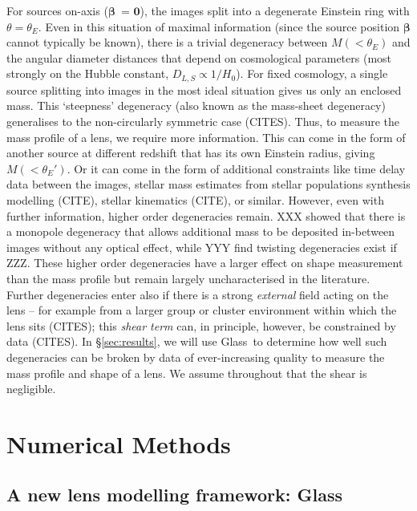\documentclass[galley,usenatbib]{mn2e}
\newcommand{\Glass}{{\sc Glass}}
\newcommand{\secref}[1] {\S\ref{#1}}
\renewcommand{\vec}[1]{\ensuremath{\boldsymbol{#1}}}
\begin{document}
For sources on-axis (\vec\beta\ = \vec0), the images split into a degenerate Einstein ring with $\theta = \theta_E$. Even in this situation of maximal information (since the source position $\vec\beta$ cannot typically be known), there is a trivial degeneracy between $M(<\theta_E)$ and the angular diameter distances that depend on cosmological parameters (most strongly on the Hubble constant, $D_{L,S} \propto 1/H_0$). For fixed cosmology, a single source splitting into images in the most ideal situation gives us only an enclosed mass. This `steepness' degeneracy (also known as the mass-sheet degeneracy) generalises to the non-circularly symmetric case (CITES). Thus, to measure the mass profile of a lens, we require more information. This can come in the form of another source at different redshift that has its own Einstein radius, giving $M(<\theta_E')$. Or it can come in the form of additional constraints like time delay data between the images, stellar mass estimates from stellar populations synthesis modelling (CITE), stellar kinematics (CITE), or similar. However, even with further information, higher order degeneracies remain. XXX showed that there is a monopole degeneracy that allows additional mass to be deposited in-between images without any optical effect, while YYY find twisting degeneracies exist if ZZZ. These higher order degeneracies have a larger effect on shape measurement than the mass profile but remain largely uncharacterised in the literature. Further degeneracies enter also if there is a strong {\it external} field acting on the lens -- for example from a larger group or cluster environment within which the lens sits (CITES); this {\it shear term} can, in principle, however, be constrained by data (CITES). In \secref{sec:results}, we will use \Glass\ to determine how well such degeneracies can be broken by data of ever-increasing quality to measure the mass profile and shape of a lens. We assume throughout that the shear is negligible. 

\section{Numerical Methods}\label{sec:glass}

\subsection{A new lens modelling framework: \Glass}
\end{document}
